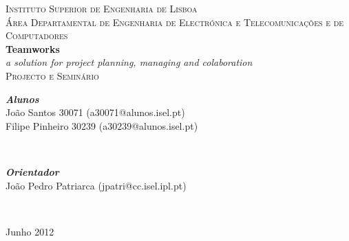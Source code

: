 \documentclass[]{article}
\begin{document}
\begin{titlepage}
\begin{center}
\textsc{\large Instituto Superior de Engenharia de Lisboa}\\[0.4cm]
\textsc{\large Área Departamental de Engenharia de Electrónica e Telecomunicações e de Computadores }\\[3cm]
{ \Huge \bfseries Teamworks}\\[1cm]
{ \Large \emph{a solution for project planning, managing and colaboration} }\\[1cm]
\textsc{\large Projecto e Seminário}\\[2cm]
\begin{minipage}{1\textwidth}
\begin{flushleft} \large
\textbf{\emph{Alunos}}\\
João Santos 30071 (a30071@alunos.isel.pt) \\
Filipe Pinheiro 30239 (a30239@alunos.isel.pt)
\end{flushleft}
\end{minipage}\\[0.5cm]
\begin{minipage}{1\textwidth}
\begin{flushright} \large
\textbf{\emph{Orientador}}\\
João Pedro Patriarca (jpatri@cc.isel.ipl.pt)
\end{flushright}
\end{minipage}
\vfill
\begin{minipage}{1\textwidth}
\\[1cm]
\end{minipage}
\vfill
{\large Junho 2012}
\end{center}
\end{titlepage}
\tableofcontents

\end{document}
